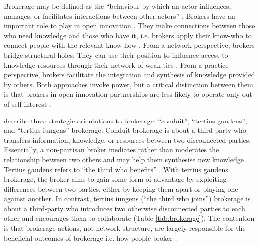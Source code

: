 Brokerage may be defined as the \enquote{behaviour by which an actor influences, manages, or facilitates interactions between other actors} \citep{obstfeld2014brokerage}. Brokers have an important role to play in open innovation \citep{whelan2011creating,cococcioni2014exploring}. They make connections between those who need knowledge and those who have it, i.e. brokers apply their know-who to connect people with the relevant know-how \citep{davenport1998working}. From a network perspective, brokers bridge structural holes. They can use their position to influence access to knowledge resources through their network of weak ties \citep{burt1992structural,hanneman2005introduction,davis2010agency,simpson2011network,stovel2012brokerage}. From a practice perspective, brokers facilitate the integration and synthesis of knowledge provided by others. Both approaches invoke power, but a critical distinction between them is that brokers in open innovation partnerships are less likely to operate only out of self-interest \citep{lingo2010nexus,marabelli2016strategic}. \medskip

\citet{obstfeld2014brokerage} describe three strategic orientations to brokerage: \enquote{conduit}, \enquote{tertius gaudens}, and \enquote{tertius iungens} brokerage. Conduit brokerage is about a third party who transfers information, knowledge, or resources between two disconnected parties. Essentially, a non-partisan broker mediates rather than moderates the relationship between two others and may help them synthesise new knowledge \citep{simmel1950sociology,grosser2019measuring}. Tertius gaudens refers to \enquote{the third who benefits} \citep{simmel1950sociology}. With tertius gaudens brokerage, the broker aims to gain some form of advantage by exploiting differences between two parties, either by keeping them apart or playing one against another. In contrast, tertius iungens (\enquote{the third who joins}) brokerage is about a third-party who introduces two otherwise disconnected parties to each other and encourages them to collaborate (Table \ref{tab:brokerage}). The contention is that brokerage actions, not network structure, are largely responsible for the beneficial outcomes of brokerage i.e. how people broker \citep{grosser2019measuring}. \medskip

